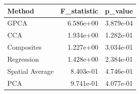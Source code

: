 \begin{tabular}{lrr}
\toprule
Method & F_statistic & p_value \\
\midrule
GPCA & 6.586e+00 & 3.879e-04 \\
CCA & 1.934e+00 & 1.282e-01 \\
Composites & 1.227e+00 & 3.034e-01 \\
Regression & 1.428e+00 & 2.384e-01 \\
Spatial Average & 8.403e-01 & 4.746e-01 \\
PCA & 9.741e-01 & 4.077e-01 \\
\bottomrule
\end{tabular}
